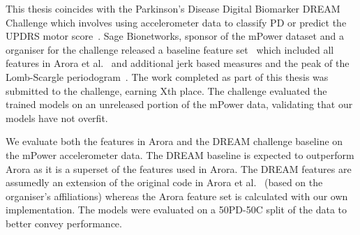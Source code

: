 \documentclass[12pt, twoside]{book}
\begin{document}
This thesis coincides with the Parkinson's Disease Digital Biomarker DREAM Challenge which involves using accelerometer data to classify PD or predict the UPDRS motor score~\cite{dreamchallengeinfo}. Sage Bionetworks, sponsor of the mPower dataset and a organiser for the challenge released a baseline feature set~\cite{mpowertools} which included all features in Arora et al.~\cite{arora2014high} and additional jerk based measures and the peak of the Lomb-Scargle periodogram~\cite{lombscargle}. The work completed as part of this thesis was submitted to the challenge, earning Xth place. The challenge evaluated the trained models on an unreleased portion of the mPower data, validating that our models have not overfit.

We evaluate both the features in Arora and the DREAM challenge baseline on the mPower accelerometer data. The DREAM baseline is expected to outperform Arora as it is a superset of the features used in Arora. The DREAM features are assumedly an extension of the original code in Arora et al.~\cite{arora2014high} (based on the organiser's affiliations) whereas the Arora feature set is calculated with our own implementation. The models were evaluated on a 50PD-50C split of the data to better convey performance.
\end{document}

